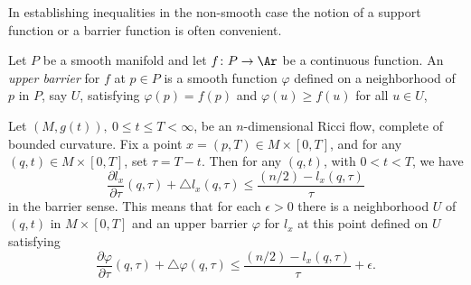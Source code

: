 In establishing inequalities in the non-smooth case the notion of a
support function or a barrier function is often convenient.

\begin{definition}
\label{def:upper-barrier}
Let $P$ be a smooth manifold and let $f\colon P\to \Ar$ be a continuous
function. An {\em upper barrier} for $f$ at $p\in P$ is a
smooth function $\varphi$ defined on a neighborhood of $p$ in $P$, say $U$,
satisfying $\varphi(p)=f(p)$ and $\varphi(u)\ge f(u)$ for all $u\in U$, 
\end{definition}





\begin{proposition}
\label{prop:l-barrier-inequality}
\label{weaksense}
Let $(M,g(t)),\ 0\le t\le T<\infty$, be an $n$-dimensional Ricci
flow,  complete  of bounded curvature. Fix a point $x=(p,T)\in
M\times [0,T]$, and for any $(q,t)\in M\times [0,T]$, set
$\tau=T-t$. Then for any $(q,t)$, with $0<t<T$, we have
$$\frac{\partial l_x}{\partial \tau}(q,\tau) +\triangle l_x(q,\tau)\le
\frac{(n/2)-l_x(q,\tau)}{\tau}$$ in the barrier sense. This means
that
 for each $\epsilon>0$ there is a neighborhood $U$ of $(q,t)$ in
 $M\times [0,T]$
 and an upper barrier $\varphi$ for $l_x$ at this point defined on $U$
satisfying
$$\frac{\partial \varphi}{\partial \tau}(q,\tau)+\triangle \varphi(q,\tau)
\le \frac{(n/2)-l_x(q,\tau)}{\tau}+\epsilon.$$
\end{proposition}

